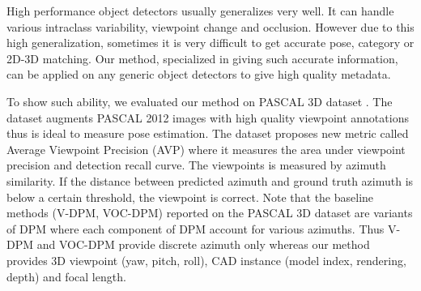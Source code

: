 \documentclass[10pt,twocolumn,letterpaper]{article}
\begin{document}
High performance object detectors usually generalizes very well. It can handle various intraclass variability, viewpoint change and occlusion. However due to this high generalization, sometimes it is very difficult to get accurate pose, category or 2D-3D matching. Our method, specialized in giving such accurate information, can be applied on any generic object detectors to give high quality metadata.

To show such ability, we evaluated our method on PASCAL 3D dataset \cite{Xiang14}. The dataset augments PASCAL 2012 images with high quality viewpoint annotations thus is ideal to measure pose estimation. The dataset proposes new metric called Average Viewpoint Precision (AVP) where it measures the area under viewpoint precision and detection recall curve. The viewpoints is measured by azimuth similarity. If the distance between predicted azimuth and ground truth azimuth is below a certain threshold, the viewpoint is correct. Note that the baseline methods (V-DPM, VOC-DPM) reported on the PASCAL 3D dataset are variants of DPM where each component of DPM account for various azimuths. Thus V-DPM and VOC-DPM provide discrete azimuth only whereas our method provides 3D viewpoint (yaw, pitch, roll), CAD instance (model index, rendering, depth) and focal length.
\end{document}
